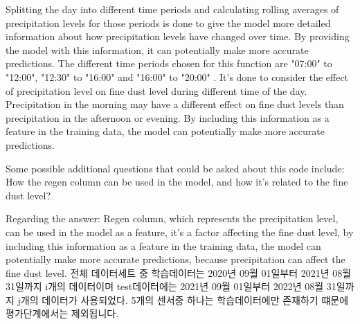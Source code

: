         Splitting the day into different time periods and calculating rolling averages of precipitation levels for those periods is done to give the model more detailed information about how precipitation levels have changed over time. By providing the model with this information, it can potentially make more accurate predictions. The different time periods chosen for this function are "07:00" to "12:00", "12:30" to "16:00" and "16:00" to "20:00" . It's done to consider the effect of precipitation level on fine dust level during different time of the day. Precipitation in the morning may have a different effect on fine dust levels than precipitation in the afternoon or evening. By including this information as a feature in the training data, the model can potentially make more accurate predictions.
        
        Some possible additional questions that could be asked about this code include:
        How the regen column can be used in the model, and how it's related to the fine dust level?
        
        Regarding the answer:
        Regen column, which represents the precipitation level, can be used in the model as a feature, it's a factor affecting the fine dust level, by including this information as a feature in the training data, the model can potentially make more accurate predictions, because precipitation can affect the fine dust level.
        전체 데이터세트 중 학습데이터는 2020년 09월 01일부터 2021년 08월 31일까지 i개의 데이터이며 test데이터에는 2021년 09월 01일부터 2022년 08월 31일까지 j개의 데이터가 사용되었다. 5개의 센서중 하나는 학습데이터에만 존재하기 떄문에 평가단계에서는 제외됩니다.